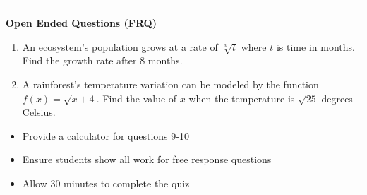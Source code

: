 \documentclass[10pt]{article}
\begin{document}
\vspace{-0.2cm}
\hrule
\vspace{0.2cm}
\textbf{\small Open Ended Questions (FRQ)}
\begin{enumerate}[label=\textbf{Q\arabic*.}, start=9, itemsep=5pt, topsep=0pt]

  \item \small An ecosystem's population grows at a rate of $\sqrt[3]{t}$ where $t$ is time in months. Find the growth rate after 8 months. \vspace{2cm}

  \item \small A rainforest's temperature variation can be modeled by the function $f(x) = \sqrt{x+4}$. Find the value of $x$ when the temperature is $\sqrt{25}$ degrees Celsius. \vspace{2cm}

\end{enumerate}

\vfill

\begin{tcolorbox}[colback=blue!5, colframe=mainblue!50, title=\small \textbf{Chef's Tips}, fonttitle=\bfseries, bottom=1mm]
\begin{itemize}[noitemsep, topsep=2pt, leftmargin=0.5cm]
  \item \scriptsize Provide a calculator for questions 9-10\item \scriptsize Ensure students show all work for free response questions\item \scriptsize Allow 30 minutes to complete the quiz
\end{itemize}
\end{tcolorbox}
\end{document}
